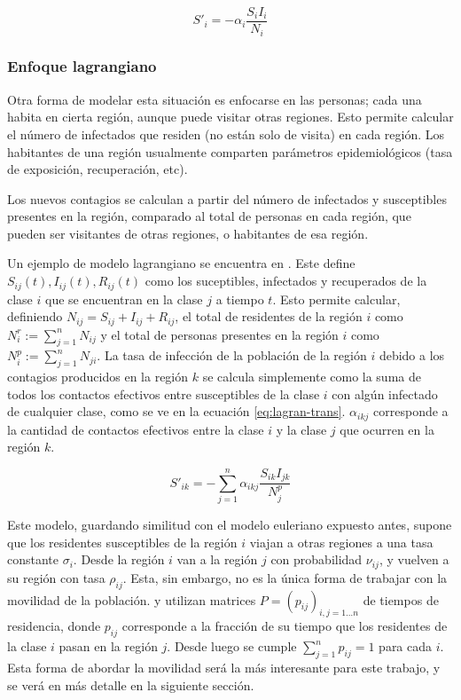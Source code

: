 \begin{equation}\label{eq:migration-transmis}
S'_i = - \alpha_i\frac{S_iI_i}{N_i}
\end{equation}

\subsubsection*{Enfoque lagrangiano}

Otra forma de modelar esta situación es enfocarse en las personas; cada una habita en cierta región, aunque puede visitar otras regiones. Esto permite calcular el número de infectados que residen (no están solo de visita) en cada región. Los habitantes de una región usualmente comparten parámetros epidemiológicos (tasa de exposición, recuperación, etc). 

Los nuevos contagios se calculan a partir del número de infectados y susceptibles presentes en la región, comparado al total de personas en cada región, que pueden ser visitantes de otras regiones, o habitantes de esa región.

Un ejemplo de modelo lagrangiano se encuentra en \cite{Ruan2006}. Este define \(S_{ij}(t), I_{ij}(t), R_{ij}(t)\) como los suceptibles, infectados y recuperados de la clase \(i\) que se encuentran en la clase \(j\) a tiempo \(t\).  Esto permite calcular, definiendo \(N_{ij} = S_{ij} + I_{ij} + R_{ij}\), el total de residentes de la región \(i\) como \(N^r_i := \sum_{j = 1}^n N_{ij}\) y el total de personas presentes en la región \(i\) como \(N^p_i := \sum_{j = 1}^n N_{ji}\). La tasa de infección de la población de la región \(i\) debido a los contagios producidos en la región \(k\) se calcula simplemente como la suma de todos los contactos efectivos entre susceptibles de la clase \(i\) con algún infectado de cualquier clase, como se ve en la ecuación \ref{eq:lagran-trans}. \(\alpha_{ikj}\) corresponde a la cantidad de contactos efectivos entre la clase \(i\) y la clase \(j\) que ocurren en la región \(k\).

\begin{equation}\label{eq:lagran-trans}
S'_{ik} = -\sum_{j = 1}^n \alpha_{ikj} \frac{S_{ik}I_{jk}}{N^p_j}
\end{equation}

Este modelo, guardando similitud con el modelo euleriano expuesto antes, supone que los residentes susceptibles de la región \(i\) viajan a otras regiones a una tasa constante \(\sigma_i\). Desde la región \(i\) van a la región \(j\) con probabilidad \(\nu_{ij}\), y vuelven a su región con tasa \(\rho_{ij}\). Esta, sin embargo, no es la única forma de trabajar con la movilidad de la población. \cite{Cosner2009} y \cite{Bichara2015} utilizan matrices \(P = (p_{ij})_{i, j = 1 \dots n}\) de tiempos de residencia, donde \(p_{ij}\) corresponde a la fracción de su tiempo que los residentes de la clase \(i\) pasan en la región \(j\). Desde luego se cumple \(\sum_{j = 1}^n p_{ij} = 1\) para cada \(i\). Esta forma de abordar la movilidad será la más interesante para este trabajo, y se verá en más detalle en la siguiente sección.




